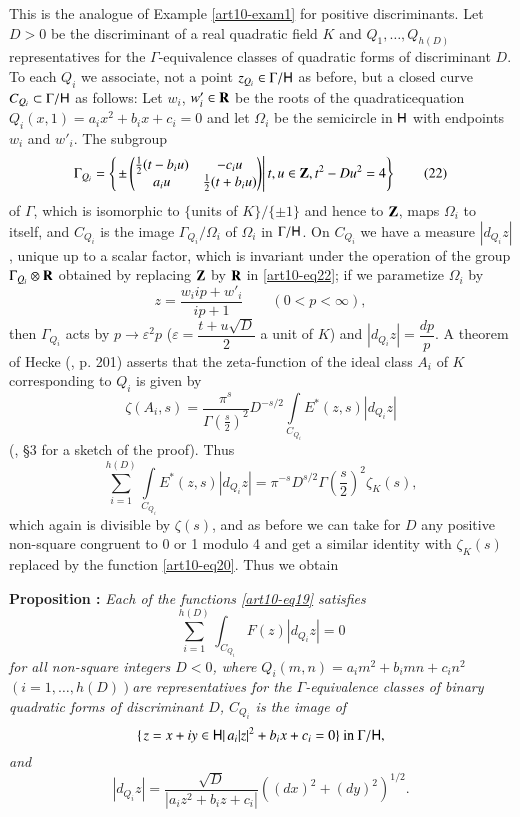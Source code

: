 This is the analogue of Example \ref{art10-exam1} for positive discriminants. Let  $D > 0$ be the discriminant of a real quadratic field $K$ and $Q_1, \ldots, Q_{h(D)}$ representatives for the $\Gamma$-equivalence classes of quadratic forms of discriminant $D$. To each $Q_i$  we associate, not a point $z_{Q_i} \in \Gamma / \mathsf{H}$ as before, but a closed curve $C_{Q_i} \subset \Gamma / \mathsf{H}$ as follows: Let $w_i$, $w'_i \in \mathbf{R}$ be the roots of the quadratic\pageoriginale equation $Q_i(x,1) = a_i x^2 + b_i x + c_i = 0$ and let $\Omega_i$ be the semicircle in $\mathsf{H}$ with endpoints $w_i$ and $w'_i$. The subgroup
\begin{equation*}
\Gamma_{Q_i} = 
\left\{
\left.  \pm 
\left(\begin{matrix} 
\frac{1}{2} (t - b_i u) & -c_i u \\
a_i u & \frac{1}{2} (t + b_i u)   
\end{matrix}\right) 
\right|
t, u \in \mathbf{Z} , t^2 - D u^2  = 4 \right\}\tag{22}
\label{art10-eq22}
\end{equation*}
of $\Gamma$, which is isomorphic to $\{$units of $K\} / \{\pm 1\}$  and hence to $\mathbf{Z}$, maps $\Omega_i$ to itself, and $C_{Q_i}$ is the image $\Gamma_{Q_i} / \Omega_i$ of $\Omega_i$ in $\Gamma / \mathsf{H}$. On $C_{Q_i}$ we have a measure $|d_{Q_i} z|$, unique up to a scalar factor, which is invariant under the operation of the group $\Gamma_{Q_i} \otimes \mathbf{R}$  obtained by replacing $\mathbf{Z}$ by $\mathbf{R}$ in \eqref{art10-eq22}; if we parametize $\Omega_i$ by
$$
z = \frac{w_i i p + w'_i }{i p+1} \qquad (0 < p < \infty), 
$$
then $\Gamma_{Q_i}$ acts by $p \to \varepsilon^2 p$ ($\varepsilon = \dfrac{t + u \sqrt{D}}{2}$ a unit of $K$)  and $|d_{Q_i} z| = \dfrac{dp}{p}$. A theorem of Hecke (\cite{art10-2}, p. 201) asserts that the zeta-function of the ideal class $A_i$ of $K$ corresponding to $Q_i$ is given by 
$$
\zeta(A_i, s) = \frac{\pi^s}{\Gamma (\frac{s}{2})^2} D^{-s/2}\int\limits_{C_{Q_i}} E^\ast (z,s) |d_{Q_i} z|
$$
(\cf \cite{art10-10},  \S 3 for a sketch of the proof). Thus
$$
\sum\limits^{h(D)}_{i=1} \int\limits_{C_{Q_i}} E^\ast (z,s) |d_{Q_i} z| = \pi^{-s} D^{s/2} \Gamma (\frac{s}{2})^2 \zeta_K (s),
$$
which again is divisible by $\zeta(s)$, and as before we can take for $D$ any positive non-square congruent to 0 or 1 modulo 4 and get a similar identity with $\zeta_K(s)$ replaced by the function \eqref{art10-eq20}. Thus we obtain

\medskip
\noindent
{\bfseries Proposition :\label{art10-prop2}}
\textit{Each of the functions \eqref{art10-eq19} satisfies}
\begin{equation}
\sum\limits^{h(D)}_{i=1} \int_{C_{Q_i}} F (z) |d_{Q_i} z| = 0 \tag{23}\label{art10-eq23} 
\end{equation}
\textit{for all non-square integers $D < 0$, where $Q_i (m,n) = a_i m^2 + b_i mn + c_i n^2$ $(i=1,\ldots, h(D))$\pageoriginale are representatives for the $\Gamma$-equivalence classes of binary quadratic forms of discriminant $D$, $C_{Q_i}$ is the image of}
$$
\{\left.z = x+ iy \in \mathsf{H} \right| a_i |z|^2 +  b_i x+ c_i =0\}\text{~ in~ } \Gamma / \mathsf{H},
$$ 
{\em and}
$$
|d_{Q_i} z| = \frac{\sqrt{D}}{|a_i z^2 + b_i z + c_i|} ((dx)^2 + (dy)^2)^{1/2}.
$$

